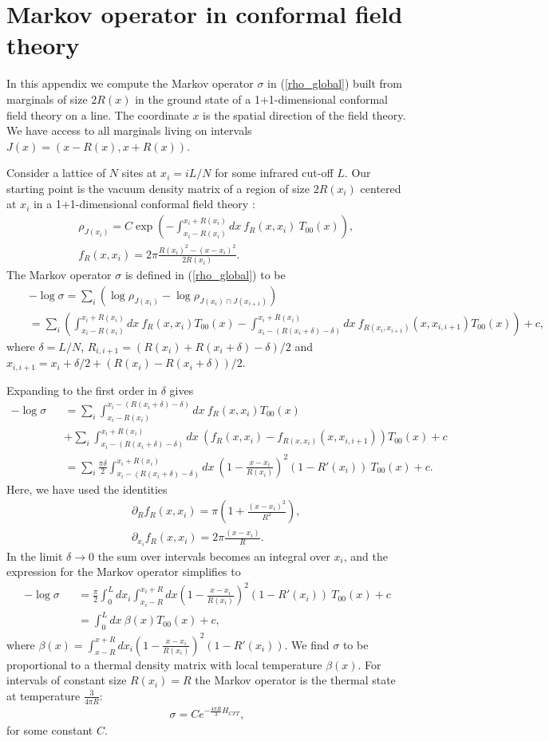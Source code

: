 \documentclass[12pt]{article}
\newcommand{\rb}{\right)}
\newcommand{\lb}{\left(}
\def\bea{\begin{eqnarray}}
\def\eea{\end{eqnarray}}
\newcommand{\nn}{\nonumber}
\begin{document}
\section{Markov operator in conformal field theory} \label{cft-calc}
In this appendix we compute the Markov operator $\sigma$ in (\ref{rho_global}) built from marginals of size $2R(x)$ in the ground state of a 1+1-dimensional conformal field theory on a line. 
The coordinate $x$ is the spatial direction of the field theory.  We have access to all marginals living on intervals $J(x)=(x-R(x),x+R(x))$.

Consider a lattice of $N$ sites at $x_i=i L/N$ for some infrared cut-off $L$. Our starting point is the vacuum density matrix of a region of size $2R(x_i)$ centered at $x_i$ in a 1+1-dimensional conformal field theory \cite{casini2011towards}:
\bea
&&\rho_{J(x_i)}=C\exp\lb -\int^{x_i+R(x_i)}_{x_i-R(x_i)} dx\:f_R(x,x_i)\:T_{00}(x)\rb,\nn\\
&&f_R(x,x_i)=2\pi \frac{R(x_i)^2-(x-x_i)^2}{2R(x_i)}.
\eea
The Markov operator $\sigma$ is defined in (\ref{rho_global}) to be
\bea
&&-\log\sigma=\sum_i\lb \log\rho_{J(x_i)}-\log\rho_{J(x_i)\cap J(x_{i+1})}\rb\nn\\
&&=\sum_i\lb\int_{x_i-R(x_i)}^{x_i+R(x_i)} dx\:f_R(x,x_i)T_{00}(x)-\int_{x_i-(R(x_i+\delta)-\delta)}^{x_i+R(x_i)}dx\:f_{R(x_i,x_{i+1})}(x,x_{i,i+1})T_{00}(x)\rb+c,\nn
\eea
where $\delta=L/N$, $R_{i,i+1}=(R(x_i)+R(x_i+\delta)-\delta)/2$ and $x_{i,i+1}=x_i+\delta/2+(R(x_i)-R(x_i+\delta))/2$.

Expanding to the first order in $\delta$ gives
\bea
-\log\sigma&&=\sum_i\int_{x_i-R(x_i)}^{x_i-(R(x_i+\delta)-\delta)} dx\:f_R(x,x_i)T_{00}(x)\nn\\
&&+\sum_i\int_{x_i-(R(x_i+\delta)-\delta)}^{x_i+R(x_i)}dx\:\lb f_R(x,x_i)-f_{R(x,x_i)}(x,x_{i,i+1})\rb T_{00}(x)+c\nn\\
&&=\sum_i\frac{\pi\delta}{2}\int_{x_i-(R(x_i+\delta)-\delta)}^{x_i+R(x_i)} dx\:\lb1-\frac{x-x_i}{R(x_i)}\rb^2(1-R'(x_i))\: T_{00}(x)+c.
\eea
Here, we have used the identities
\bea
&&\partial_Rf_R(x,x_i)=\pi\lb 1+\frac{(x-x_i)^2}{R^2}\rb,\nn\\
&&\partial_{x_i}f_R(x,x_i)=2\pi\frac{(x-x_i)}{R}.
\eea
In the limit $\delta\to 0$ the sum over intervals becomes an integral over $x_i$, and the expression for the Markov operator simplifies to
\bea
-\log\sigma&&=\frac{\pi}{2}\int_{0}^{L}dx_i\int_{x_i-R}^{x_i+R}dx\lb 1-\frac{x-x_i}{R(x_i)}\rb^2(1-R'(x_i))\: T_{00}(x)+c\nn\\
&&=\int_0^L dx\: \beta(x)T_{00}(x)+c,
\eea
where $\beta(x)=\int_{x-R}^{x+R}dx_i\lb 1-\frac{x-x_i}{R(x_i)}\rb^2(1-R'(x_i))$.
We find $\sigma$ to be proportional to a thermal density matrix with local temperature $\beta(x)$. For intervals of constant size $R(x_i)=R$  the Markov operator is the thermal state at temperature $\frac{3}{4\pi R}$:
\bea
\sigma= C e^{-\frac{4\pi R}{3} H_{CFT}},
\eea
for some constant $C$.
\end{document}
